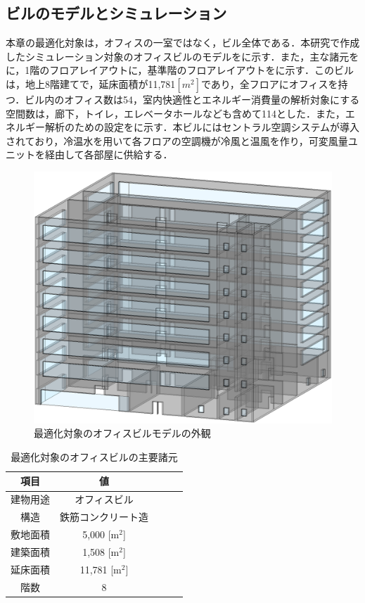 \subsection{ビルのモデルとシミュレーション}
本章の最適化対象は，オフィスの一室ではなく，ビル全体である．本研究で作成したシミュレーション対象のオフィスビルのモデルをに示す．また，主な諸元をに，1階のフロアレイアウトに，基準階のフロアレイアウトをに示す．このビルは，地上8階建てで，延床面積が11,781$[m^2]$であり，全フロアにオフィスを持つ．ビル内のオフィス数は54，室内快適性とエネルギー消費量の解析対象にする空間数は，廊下，トイレ，エレベータホールなども含めて114とした．また，エネルギー解析のための設定をに示す．本ビルにはセントラル空調システムが導入されており，冷温水を用いて各フロアの空調機が冷風と温風を作り，可変風量ユニットを経由して各部屋に供給する．

\begin{figure}[htbp]
  \begin{center}
    \includegraphics[width=0.6\linewidth]{fig/sim_office_building.eps}
  \end{center}
  \caption{最適化対象のオフィスビルモデルの外観}
  \label{fig::sim_office_building}
\end{figure}

\begin{table}[htbp]
  {\small
    \begin{center}
      \caption{最適化対象のオフィスビルの主要諸元}
      \label{tab::sim_description}
      \begin{tabular}{c|cccc}
        \hline
        項目     & 値                 \\
        \hline \hline
        建物用途 & オフィスビル       \\
        構造     & 鉄筋コンクリート造 \\
        敷地面積 & 5,000 [m$^2$]      \\
        建築面積 & 1,508 [m$^2$]      \\
        延床面積 & 11,781 [m$^2$]     \\
        階数     & 8                  \\
        \hline
      \end{tabular}
    \end{center}
  }
\end{table}

